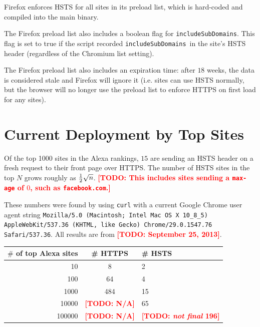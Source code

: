 \documentclass[conference]{./IEEEtran}
\newcommand{\todo}[1]{\textcolor{red}{\textbf{[TODO: #1]}}}
\newcommand{\td}[2]{\textcolor{red}{\textbf{[TODO: {\it{#1}} #2]}}}
\newcommand{\site}[1]{\texttt{#1}}
\newcommand{\code}[1]{\texttt{#1}}
\newcommand{\iSD}{{\code{includeSubDomains}}}
\theoremstyle{plain}
\begin{document}
Firefox enforces HSTS for all sites in its preload list, which is hard-coded and compiled into the main binary.

The Firefox preload list also includes a boolean flag for \iSD. This flag is set to true if the script recorded \iSD~in the site's HSTS header (regardless of the Chromium list setting).

The Firefox preload list also includes an expiration time: after $18$ weeks, the data is considered stale and Firefox will ignore it (i.e. sites can use HSTS normally, but the browser will no longer use the preload list to enforce HTTPS on first load for any sites)\cite{firefox-cron-expiration}.

\section{Current Deployment by Top Sites}

Of the top 1000 sites in the Alexa rankings, $15$ are sending an HSTS header on a fresh request to their front page over HTTPS. The number of HSTS sites in the top $N$ grows roughly as ${1 \over 2}\sqrt{n}$. \todo{This includes sites sending a \code{max-age} of $0$, such as \site{facebook.com}.}

These numbers were found by using \code{curl} with a current Google Chrome user agent string \code{Mozilla/5.0 (Macintosh; Intel Mac OS X 10\_8\_5) AppleWebKit/537.36 (KHTML, like Gecko) Chrome/29.0.1547.76 Safari/537.36}. All results are from \todo{September 25, 2013}.

\begin{table}[htdp]
\label{alexa_table}
\begin{center}
\begin{tabular}{|r|c|l|}
\hline
$\#$ of top Alexa sites & \# HTTPS & \# HSTS\\
\hline
10 & 8 & 2 \\
\hline
100 & 64 & 4 \\	
\hline
1000 & 484 &15 \\
\hline
10000 & \todo{N/A} & 65\\
\hline
100000 & \todo{N/A} & \td{not final}{196}\\
\hline
\end{tabular}
\end{center}
\end{table}%
\end{document}
